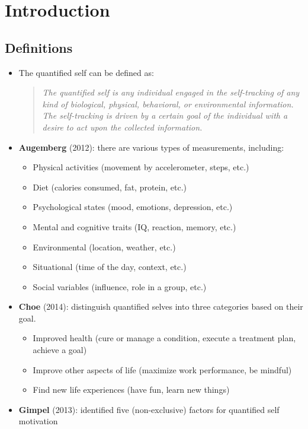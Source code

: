 \section{Introduction}
\label{sec:chapter_1_2_introduction}
\subsection{Definitions}
\begin{itemize}
	\item The quantified self can be defined as:
	\blockquote{\textit{The quantified self is any individual engaged in the self-tracking of any kind of biological, physical, behavioral, or environmental information. \\The self-tracking is driven by a certain goal of the individual with a desire to act upon the collected information.}}
	\item \textbf{Augemberg} (2012): there are various types of measurements, including:
	\begin{itemize}
		\item Physical activities (movement by accelerometer, steps, etc.)
		\item Diet (calories consumed, fat, protein, etc.)
		\item Psychological states (mood, emotions, depression, etc.)
		\item Mental and cognitive traits (IQ, reaction, memory, etc.)
		\item Environmental (location, weather, etc.)
		\item Situational (time of the day, context, etc.)
		\item Social variables (influence, role in a group, etc.)
	\end{itemize} 
	\item \textbf{Choe} (2014): distinguish quantified selves into three categories based on their goal.
	\begin{itemize}
		\item Improved health (cure or manage a condition,
		execute a treatment plan, achieve a goal)
		\item Improve other aspects of life (maximize work performance, be mindful)
		\item Find new life experiences (have fun, learn new things)	
	\end{itemize}
	\item \textbf{Gimpel} (2013): identified five (non-exclusive) factors for quantified self motivation
	\begin{itemize}

\end{itemize}
\end{itemize}
